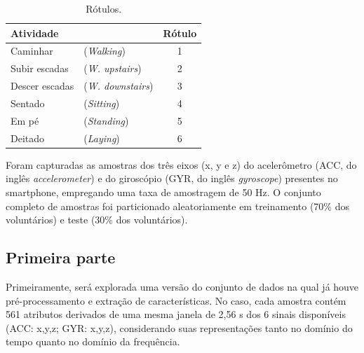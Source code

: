 \documentclass[final,5p]{elsarticle}
\numberwithin{equation}{section}
\begin{document}
    \begin{table}[h]
        \begin{minipage}{\linewidth}
        \centering
        \begin{tabular}{l l c}
            \toprule
            \textbf{Atividade} & & \textbf{Rótulo} \\
            \midrule
            Caminhar & (\emph{Walking}) & 1 \\
            Subir escadas & (\emph{W. upstairs}) & 2 \\
            Descer escadas & (\emph{W. downstairs}) & 3 \\
            Sentado & (\emph{Sitting}) & 4 \\
            Em pé & (\emph{Standing}) & 5 \\
            Deitado & (\emph{Laying}) & 6 \\
            \bottomrule
        \end{tabular}
        \caption{Rótulos\protect\footnotemark.}
        \label{tab:rotulos}
        \end{minipage}
    \end{table}

    Foram capturadas as amostras dos três eixos (x, y e z) do acelerômetro (ACC, do inglês \emph{accelerometer}) e do giroscópio (GYR, do inglês \emph{gyroscope}) presentes no smartphone, empregando uma taxa de amostragem de 50 Hz. O conjunto completo de amostras foi particionado aleatoriamente em treinamento (70\% dos voluntários) e teste (30\% dos voluntários).

    \subsection{Primeira parte}

        Primeiramente, será explorada uma versão do conjunto de dados na qual já houve pré-processamento e extração de características. No caso, cada amostra contém 561 atributos derivados de uma mesma janela de 2,56 s dos 6 sinais disponíveis (ACC: x,y,z; GYR: x,y,z), considerando suas representações tanto no domínio do tempo quanto no domínio da frequência.
\end{document}
